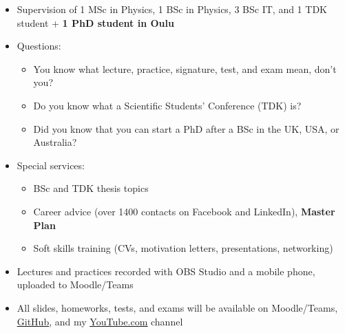 \documentclass[t,aspectratio=169]{beamer}
\begin{document}
\begin{frame}
\begin{itemize}
\begin{itemize}
\item 2024–2025: \textit{NASA Goddard Space Flight Center, Greenbelt, MD, USA} – External Contractor (Visiting Scientist in 2016, 2017, 2023)
\item \textbf{2025–present: Obuda University, Faculty of Electrical Engineering, Budapest}~–~Teaching (KTXFI1EBNF)~Physics~I., and (KTXFI2EBNF)~Physics~II. for BSc Electrical Engineering students in English
\end{itemize}
\pagebreak
\item Supervision of 1 MSc in Physics, 1 BSc in Physics, 3 BSc IT, and 1 TDK student + \textbf{ 1 PhD student in Oulu}
\item Questions:
\begin{itemize}
\item You know what lecture, practice, signature, test, and exam mean, don’t you?
\item Do you know what a Scientific Students’ Conference (TDK) is?
\item Did you know that you can start a PhD after a BSc in the UK, USA, or Australia?
\end{itemize}
\item Special services:
 \begin{itemize}
\setlength{\parskip}{0pt}
\setlength{\itemsep}{0pt}
\item BSc and TDK thesis topics
\item Career advice (over 1400 contacts on Facebook and LinkedIn), \textbf{Master Plan}
\item Soft skills training (CVs, motivation letters, presentations, networking)
\end{itemize}
\item Lectures and practices recorded with OBS Studio and a mobile phone, uploaded to Moodle/Teams
\item All slides, homeworks, tests, and exams will be available on Moodle/Teams, \underline{\href{https://github.com/gfacsko}{GitHub}}, and my \underline{\href{https://www.youtube.com/@gaborfacsko4971}{YouTube.com}} channel
\end{itemize}
\end{frame}

\end{document}
